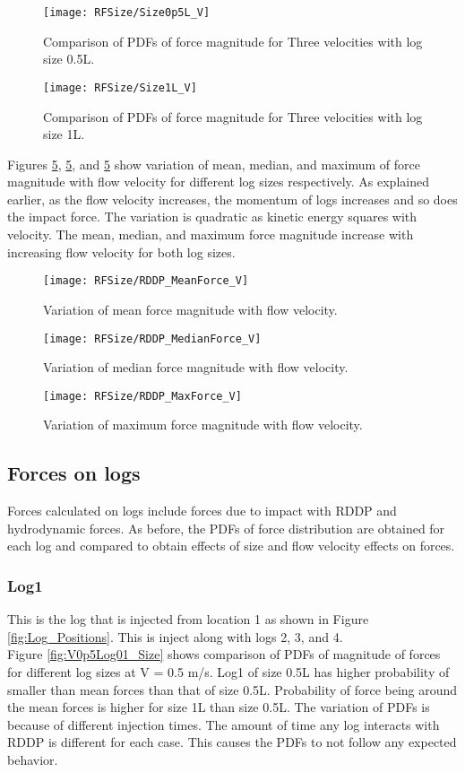\begin{figure}
\centering
\texttt{[image: RFSize/Size0p5L\_V]}
\caption{\label{fig:RFSize0p5L_V}Comparison of PDFs of force magnitude for Three velocities with log size 0.5L.}
\end{figure} 
\begin{figure}
\centering
\texttt{[image: RFSize/Size1L\_V]}
\caption{\label{fig:RFSize1L_V}Comparison of PDFs of force magnitude for Three velocities with log size 1L.}
\end{figure}

\noindent Figures \ref{fig:RDDP_MeanForce_V}, \ref{fig:RDDP_MeanForce_V}, and \ref{fig:RDDP_MeanForce_V} show variation of mean, median, and maximum of force magnitude with flow velocity for different log sizes respectively. As explained earlier, as the flow velocity increases, the momentum of logs increases and so does the impact force. The variation is quadratic as kinetic energy squares with velocity. The mean, median, and maximum force magnitude increase with increasing flow velocity for both log sizes. 

\begin{figure}
\centering
\texttt{[image: RFSize/RDDP\_MeanForce\_V]}
\caption{\label{fig:RDDP_MeanForce_V}Variation of mean force magnitude with flow velocity.}
\end{figure}
\begin{figure}
\centering
\texttt{[image: RFSize/RDDP\_MedianForce\_V]}
\caption{\label{fig:RDDP_MeanForce_V}Variation of median force magnitude with flow velocity.}
\end{figure}
\begin{figure}
\centering
\texttt{[image: RFSize/RDDP\_MaxForce\_V]}
\caption{\label{fig:RDDP_MeanForce_V}Variation of maximum force magnitude with flow velocity.}
\end{figure}
\FloatBarrier
\subsection{Forces on logs}
Forces calculated on logs include forces due to impact with RDDP and hydrodynamic forces. As before, the PDFs of force distribution are obtained for each log and compared to obtain effects of size and flow velocity effects on forces. 
\FloatBarrier
\subsubsection{Log1}
This is the log that is injected from location 1 as shown in Figure \ref{fig:Log_Positions}. This is inject along with logs 2, 3, and 4.\\ 
Figure \ref{fig:V0p5Log01_Size} shows comparison of PDFs of magnitude of forces for different log sizes at V = 0.5 m/s. Log1 of size 0.5L has higher probability of smaller  than mean forces than that of size 0.5L.  Probability of force being around the mean forces is higher for size 1L than size 0.5L. The variation of PDFs is because of different injection times. The amount of time any log interacts with RDDP is different for each case. This causes the PDFs to not follow any expected behavior.


